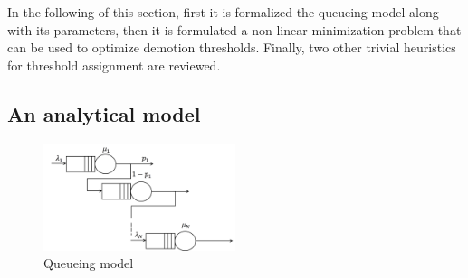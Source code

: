 In the following of this section, first it is formalized the queueing model along with its parameters, then it is formulated a non-linear minimization problem that can be used to optimize demotion thresholds. Finally, two other trivial heuristics for threshold assignment are reviewed.

\subsection{An analytical model}
\begin{figure}
	\centering
	\includegraphics[width=0.5\textwidth]{Chapter2/Figures/pias}
	\caption{Queueing model}
	\label{fig:pias}
\end{figure}

